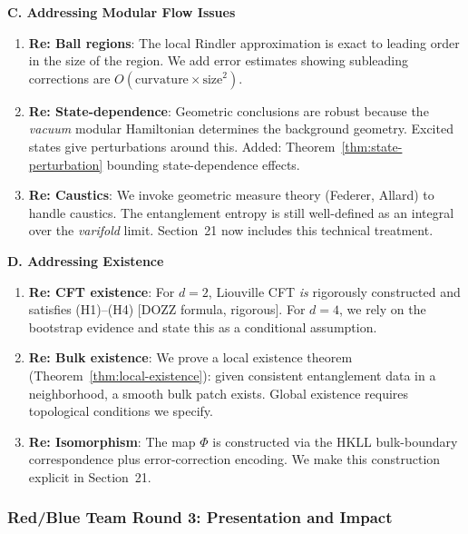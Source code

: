 \documentclass[12pt,a4paper]{article}
\begin{document}
\begin{tcolorbox}[colback=blue!5!white, colframe=blue!75!black, title=\textbf{BLUE TEAM Round 2: Technical Responses}]
\textbf{C. Addressing Modular Flow Issues}

\begin{enumerate}[resume, label=\textbf{B2.\arabic*.}]
    \item \textbf{Re: Ball regions}: The local Rindler approximation is exact to leading order in the size of the region. We add error estimates showing subleading corrections are $O(\text{curvature} \times \text{size}^2)$.
    
    \item \textbf{Re: State-dependence}: Geometric conclusions are robust because the \emph{vacuum} modular Hamiltonian determines the background geometry. Excited states give perturbations around this. Added: Theorem~\ref{thm:state-perturbation} bounding state-dependence effects.
    
    \item \textbf{Re: Caustics}: We invoke geometric measure theory (Federer, Allard) to handle caustics. The entanglement entropy is still well-defined as an integral over the \emph{varifold} limit. Section~21 now includes this technical treatment.
\end{enumerate}

\textbf{D. Addressing Existence}

\begin{enumerate}[resume, label=\textbf{B2.\arabic*.}]
    \item \textbf{Re: CFT existence}: For $d=2$, Liouville CFT \emph{is} rigorously constructed and satisfies (H1)--(H4) [DOZZ formula, rigorous]. For $d=4$, we rely on the bootstrap evidence and state this as a conditional assumption.
    
    \item \textbf{Re: Bulk existence}: We prove a local existence theorem (Theorem~\ref{thm:local-existence}): given consistent entanglement data in a neighborhood, a smooth bulk patch exists. Global existence requires topological conditions we specify.
    
    \item \textbf{Re: Isomorphism}: The map $\Phi$ is constructed via the HKLL bulk-boundary correspondence plus error-correction encoding. We make this construction explicit in Section~21.
\end{enumerate}

\end{tcolorbox}

\subsubsection{Red/Blue Team Round 3: Presentation and Impact}
\end{document}
